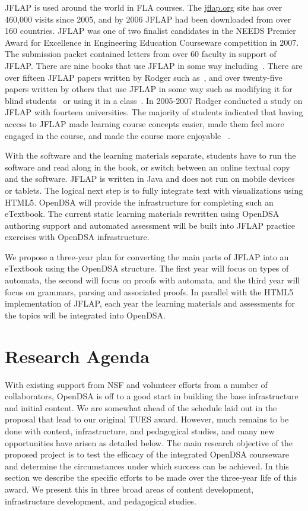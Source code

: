 \documentclass[11pt]{article}
\begin{document}
JFLAP is used around the world in FLA courses.
The \url{jflap.org} site has over 460,000 visits since 2005, and by
2006 JFLAP had been downloaded from over 160 countries.
JFLAP was one of two finalist candidates in the NEEDS
Premier Award for Excellence in Engineering Education Courseware
competition in 2007.
The submission packet contained letters from over 60
faculty in support of JFLAP.
There are nine books that use JFLAP in some way
including~\cite{Lin11,Moz10,Gop06,Ben06,God08}.
There are over fifteen JFLAP papers written by Rodger such
as~\cite{RQS11,RLR07},
and over twenty-five papers written by others that use JFLAP in some
way such as modifying it for blind students~\cite{CRA12} or using it
in a class~\cite{Nef10}.
In 2005-2007 Rodger conducted a study on JFLAP with fourteen
universities. 
The majority of students indicated that having access to JFLAP
made learning course concepts easier, made them feel more engaged in
the course, and made the course more enjoyable ~\cite{RWL09}.

With the software and the learning materials separate, students have
to run the software and read along in the book, or switch 
between an online textual copy and the software.
JFLAP is written in Java and does not run on mobile devices or tablets.
The logical next step is to fully integrate text with visualizations
using HTML5.
OpenDSA will provide the infrastructure for completing such an
eTextbook.
The current static learning materials rewritten using
OpenDSA authoring support and automated assessment will be built into
JFLAP practice exercises with OpenDSA infrastructure. 

We propose a three-year plan for converting the main parts of JFLAP
into an eTextbook using the OpenDSA structure.
The first year will focus on types of automata, the 
second will focus on proofs with automata, and the third year will
focus on  grammars, parsing and associated  proofs.
In parallel with the HTML5 implementation of JFLAP, each year the
learning materials and assessments for the topics will be
integrated into OpenDSA.

\section{Research Agenda}
\label{sec:plan}

With existing support from NSF and volunteer efforts from a number of
collaborators, OpenDSA is off to a good start in building the
base infrastructure and initial content.
We are somewhat ahead of the schedule laid out in the
proposal that lead to our original TUES award.
However, much remains to be done with content, infrastructure, and
pedagogical studies, and many new opportunities have arisen as
detailed below.
The main research objective of the proposed project is to test the
efficacy of the integrated OpenDSA courseware and determine the
circumstances under which success can be achieved.
In this section we describe the specific efforts to be made over the
three-year life of this award.
We present this in three broad areas of content development,
infrastructure development, and pedagogical studies.
\end{document}
